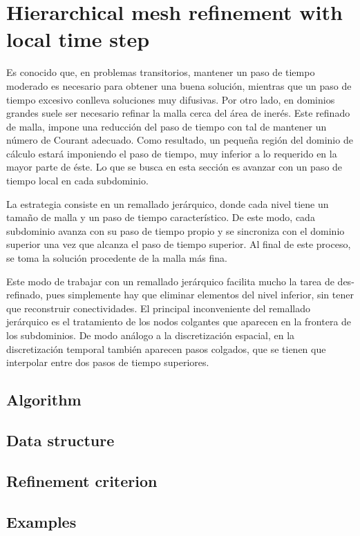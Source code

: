 
\chapter{Hierarchical mesh refinement with local time step}
\label{mesh_refinement}



Es conocido que, en problemas transitorios, mantener un paso de tiempo moderado es necesario para obtener una buena solución, mientras que un paso de tiempo excesivo conlleva soluciones muy difusivas. Por otro lado, en dominios grandes suele ser necesario refinar la malla cerca del área de inerés. Este refinado de malla, impone una reducción del paso de tiempo con tal de mantener un número de Courant adecuado. Como resultado, un pequeña región del dominio de cálculo estará imponiendo el paso de tiempo, muy inferior a lo requerido en la mayor parte de éste. Lo que se busca en esta sección es avanzar con un paso de tiempo local en cada subdominio.

La estrategia consiste en un remallado jerárquico, donde cada nivel tiene un tamaño de malla y un paso de tiempo característico. De este modo, cada subdominio avanza con su paso de tiempo propio y se sincroniza con el dominio superior una vez que alcanza el paso de tiempo superior. Al final de este proceso, se toma la solución procedente de la malla más fina.

Este modo de trabajar con un remallado jerárquico facilita mucho la tarea de des-refinado, pues simplemente hay que eliminar elementos del nivel inferior, sin tener que reconstruir conectividades. El principal inconveniente del remallado jerárquico es el tratamiento de los nodos colgantes que aparecen en la frontera de los subdominios. De modo análogo a la discretización espacial, en la discretización temporal también aparecen pasos colgados, que se tienen que interpolar entre dos pasos de tiempo superiores.


\section{Algorithm}


\section{Data structure}


\section{Refinement criterion}


\section{Examples}



